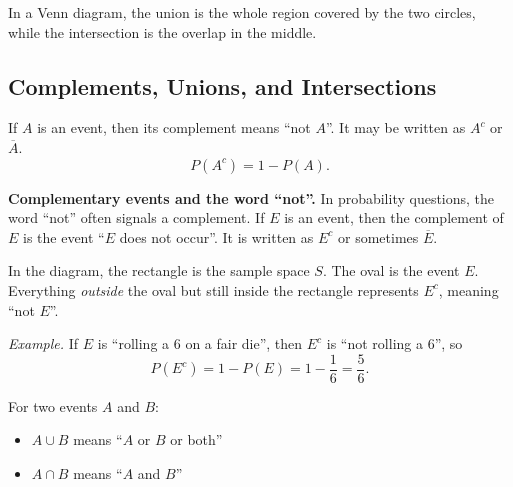 \begin{center}
\end{center}

In a Venn diagram, the union is the whole region covered by the two circles, while the intersection is the overlap in the middle.

\subsection{Complements, Unions, and Intersections}

If $A$ is an event, then its complement means ``not $A$''. It may be written as $A^c$ or $\overline{A}$.
\[
P(A^c)=1-P(A).
\]

\textbf{Complementary events and the word ``not''.} In probability questions, the word ``not'' often signals a complement. If $E$ is an event, then the complement of $E$ is the event ``$E$ does not occur''. It is written as $E^c$ or sometimes $\overline{E}$.

\begin{center}
\end{center}

In the diagram, the rectangle is the sample space $S$. The oval is the event $E$. Everything \emph{outside} the oval but still inside the rectangle represents $E^c$, meaning ``not $E$''.

\textit{Example.} If $E$ is ``rolling a $6$ on a fair die'', then $E^c$ is ``not rolling a $6$'', so
\[
P(E^c)=1-P(E)=1-\frac16=\frac56.
\]

For two events $A$ and $B$:
\begin{itemize}[leftmargin=*]
  \item $A\cup B$ means ``$A$ or $B$ or both''
  \item $A\cap B$ means ``$A$ and $B$''
\end{itemize}

